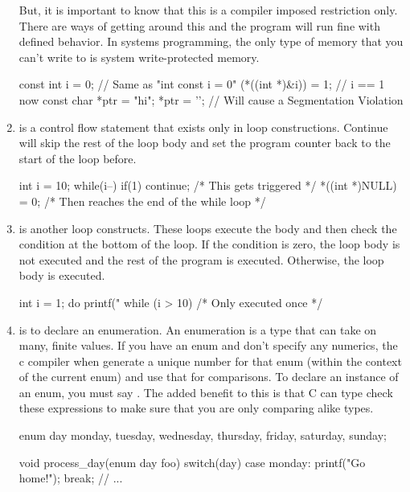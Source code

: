 \begin{enumerate}
But, it is important to know that this is a compiler imposed restriction only. There are ways of getting around this and the program will run fine with defined behavior. In systems programming, the only type of memory that you can't write to is system write-protected memory.

\begin{code}[language=C]
const int i = 0; // Same as "int const i = 0"
(*((int *)&i)) = 1; // i == 1 now
const char *ptr = "hi";
*ptr = '\0'; // Will cause a Segmentation Violation
\end{code}

\item {} is a control flow statement that exists only in loop constructions. Continue will skip the rest of the loop body and set the program counter back to the start of the loop before.

\begin{code}[language=C]
int i = 10;
while(i--) {
  if(1) continue; /* This gets triggered */
  *((int *)NULL) = 0;
} /* Then reaches the end of the while loop */
\end{code}

\item {} is another loop constructs. These loops execute the body and then check the condition at the bottom of the loop. If the condition is zero, the loop body is not executed and the rest of the program is executed. Otherwise, the loop body is executed.

\begin{code}[language=C]
int i = 1;
do {
  printf("%
} while (i > 10) /* Only executed once */
\end{code}

\item {} is to declare an enumeration. An enumeration is a type that can take on many, finite values. If you have an enum and don't specify any numerics, the c compiler when generate a unique number for that enum (within the context of the current enum) and use that for comparisons. To declare an instance of an enum, you must say . The added benefit to this is that C can type check these expressions to make sure that you are only comparing alike types.

\begin{code}[language=C]
enum day{ monday, tuesday, wednesday,
  thursday, friday, saturday, sunday};

void process_day(enum day foo) {
  switch(day) {
    case monday:
      printf("Go home!\n"); break;
    // ...
  }
}
\end{code}


\end{enumerate}
